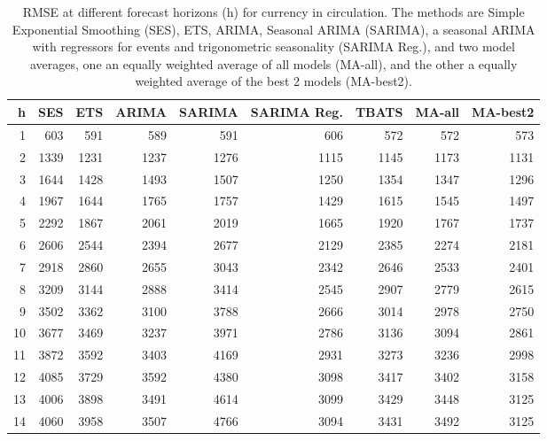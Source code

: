 \documentclass{article}
\begin{document}
\begin{table}[ht]
\centering
\begin{tabular}{rrrrrrrrr}
  \hline
h & SES & ETS & ARIMA & SARIMA & SARIMA Reg. & TBATS & MA-all & MA-best2 \\ 
  \hline
1 & 603 & 591 & 589 & 591 & 606 & 572 & 572 & 573 \\ 
  2 & 1339 & 1231 & 1237 & 1276 & 1115 & 1145 & 1173 & 1131 \\ 
  3 & 1644 & 1428 & 1493 & 1507 & 1250 & 1354 & 1347 & 1296 \\ 
  4 & 1967 & 1644 & 1765 & 1757 & 1429 & 1615 & 1545 & 1497 \\ 
  5 & 2292 & 1867 & 2061 & 2019 & 1665 & 1920 & 1767 & 1737 \\ 
  6 & 2606 & 2544 & 2394 & 2677 & 2129 & 2385 & 2274 & 2181 \\ 
  7 & 2918 & 2860 & 2655 & 3043 & 2342 & 2646 & 2533 & 2401 \\ 
  8 & 3209 & 3144 & 2888 & 3414 & 2545 & 2907 & 2779 & 2615 \\ 
  9 & 3502 & 3362 & 3100 & 3788 & 2666 & 3014 & 2978 & 2750 \\ 
  10 & 3677 & 3469 & 3237 & 3971 & 2786 & 3136 & 3094 & 2861 \\ 
  11 & 3872 & 3592 & 3403 & 4169 & 2931 & 3273 & 3236 & 2998 \\ 
  12 & 4085 & 3729 & 3592 & 4380 & 3098 & 3417 & 3402 & 3158 \\ 
  13 & 4006 & 3898 & 3491 & 4614 & 3099 & 3429 & 3448 & 3125 \\ 
  14 & 4060 & 3958 & 3507 & 4766 & 3094 & 3431 & 3492 & 3125 \\ 
   \hline
\end{tabular}
\caption{RMSE at different forecast horizons (h) for currency in circulation. The methods are Simple Exponential Smoothing (SES), ETS, ARIMA, Seasonal ARIMA (SARIMA), a seasonal ARIMA with regressors for events and trigonometric seasonality (SARIMA Reg.), and two model averages, one an equally weighted average of all models (MA-all), and the other a equally weighted average of the best 2 models (MA-best2).} 
\label{tab:rmsecic}
\end{table}
\end{document}
